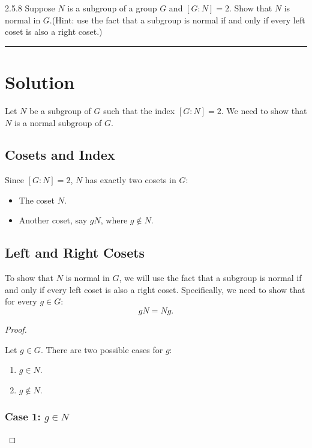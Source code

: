 \documentclass[12pt]{amsart}
\theoremstyle{definition}
\numberwithin{equation}{section}
\begin{document}
\begin{exercise}{2.5.8} Suppose $N$ is a subgroup of a group $G$ and \([G:N]=2\). Show that $N$ is normal in $G$.(Hint: use the fact that a subgroup is normal if and only if every left coset is also a right coset.)

    \noindent\rule{\linewidth}{1pt}
    
    
    \section*{Solution}

Let \(N\) be a subgroup of \(G\) such that the index \([G:N] = 2\). We need to show that \(N\) is a normal subgroup of \(G\).

\subsection*{Cosets and Index}

Since \([G:N] = 2\), \(N\) has exactly two cosets in \(G\):
\begin{itemize}
    \item The coset \(N\).
    \item Another coset, say \(gN\), where \(g \notin N\).
\end{itemize}

\subsection*{Left and Right Cosets}

To show that \(N\) is normal in \(G\), we will use the fact that a subgroup is normal if and only if every left coset is also a right coset. Specifically, we need to show that for every \(g \in G\):
\[
gN = Ng.
\]

\begin{proof} \( \)
    
    Let \(g \in G\). There are two possible cases for \(g\):
    \begin{enumerate}
        \item \(g \in N\).
        \item \(g \notin N\).
    \end{enumerate}
    
    \subsubsection*{Case 1: \(g \in N\)}
    

\end{proof}
\end{exercise}
\end{document}
